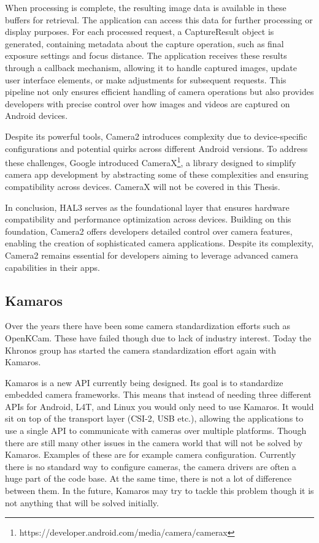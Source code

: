 When processing is complete, the resulting image data is available in these
buffers for retrieval. The application can access this data for further
processing or display purposes. For each processed request, a CaptureResult
object is generated, containing metadata about the capture operation, such as
final exposure settings and focus distance. The application receives these
results through a callback mechanism, allowing it to handle captured images,
update user interface elements, or make adjustments for subsequent requests.
This pipeline not only ensures efficient handling of camera operations but also
provides developers with precise control over how images and videos are
captured on Android devices.


Despite its powerful tools, Camera2 introduces complexity due to
device-specific configurations and potential quirks across different Android
versions. To address these challenges, Google introduced CameraX\footnote{https://developer.android.com/media/camera/camerax},
a library designed to simplify camera app development by abstracting some of
these complexities and ensuring compatibility across devices. CameraX will not
be covered in this Thesis.

In conclusion, HAL3 serves as the foundational layer that ensures hardware
compatibility and performance optimization across devices. Building on this
foundation, Camera2 offers developers detailed control over camera features,
enabling the creation of sophisticated camera applications. Despite its
complexity, Camera2 remains essential for developers aiming to leverage
advanced camera capabilities in their apps.


\subsection{Kamaros}
Over the years there have been some camera standardization efforts such as
OpenKCam. These have failed though due to lack of industry interest. Today
the Khronos group has started the camera standardization effort again with
Kamaros.

Kamaros is a new API currently being designed. Its goal is to
standardize embedded camera frameworks. This means that instead of needing
three different APIs for Android, L4T, and Linux you would only need to use
Kamaros. It would sit on top of the transport layer (CSI-2, USB etc.), allowing
the applications to use a single API to communicate with cameras over multiple
platforms. Though there are still many other issues in the camera world that will not
be solved by Kamaros. Examples of these are for example camera configuration.
Currently there is no standard way to configure cameras, the camera drivers are
often a huge part of the code base. At the same time, there is not a lot of
difference between them. In the future, Kamaros may try to tackle this problem
though it is not anything that will be solved initially.

